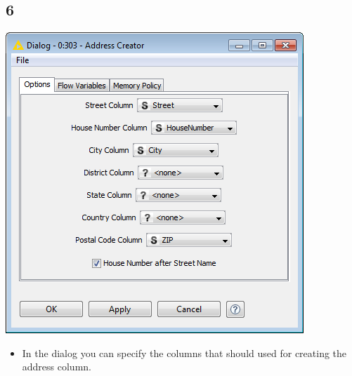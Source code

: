\documentclass{beamer}
\begin{document}
\subsection{6}
\begin{frame}
	\begin{center}
  		\includegraphics[height=0.5\textheight]{6.png}
	\end{center}
	\begin{itemize}
		\item In the dialog you can specify the columns that should used for creating the address column.		
	\end{itemize}
\end{frame}
\end{document}
